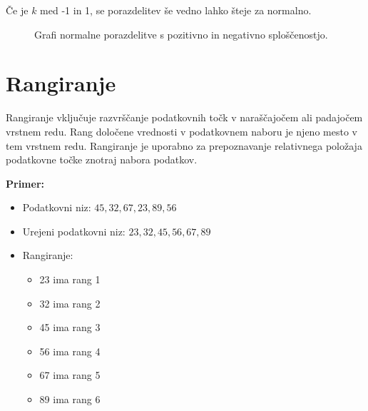 Če je $k$ med -1 in 1, se porazdelitev še vedno lahko šteje za normalno.

\begin{figure}
\centering
{}
\caption{Grafi normalne porazdelitve s pozitivno in negativno sploščenostjo.}
\end{figure}

\section{Rangiranje}

Rangiranje vključuje razvrščanje podatkovnih točk v naraščajočem ali padajočem vrstnem redu. Rang določene vrednosti v podatkovnem naboru je njeno mesto v tem vrstnem redu. Rangiranje je uporabno za prepoznavanje relativnega položaja podatkovne točke znotraj nabora podatkov.

\textbf{Primer:}
\begin{itemize}
    \item Podatkovni niz: $45, 32, 67, 23, 89, 56$
    \item Urejeni podatkovni niz: $23, 32, 45, 56, 67, 89$
    \item Rangiranje: 
    \begin{itemize}
        \item 23 ima rang 1
        \item 32 ima rang 2
        \item 45 ima rang 3
        \item 56 ima rang 4
        \item 67 ima rang 5
        \item 89 ima rang 6
    \end{itemize}
\end{itemize}


